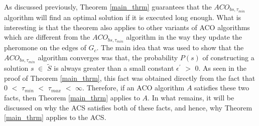 \documentclass[12pt]{article}
\numberwithin{equation}{subsection}
\numberwithin{table}{subsection}
\numberwithin{algorithm}{subsection}
\numberwithin{figure}{subsection}
\begin{document}
As discussed previously, Theorem \ref{main_thrm} guarantees that the $ACO_{bs, \tau_{min}}$ algorithm will find an optimal solution if it is executed long enough. What is interesting is that the theorem also applies to other variants of ACO algorithms which are different from the $ACO_{bs, \tau_{min}}$ algorithm in the way they update the pheromone on the edges of $G_c$. The main idea that was used to show that the $ACO_{bs, \tau_{min}}$ algorithm converges was that, the probability $P(s)$ of constructing a solution $s$ $\in$ $\widetilde{S}$ is always greater than a small constant $\epsilon^\prime$ $>$ 0. As seen in the proof of Theorem \ref{main_thrm}, this fact was obtained directly from the fact that 0 $<$ $\tau_{min}$ $<$ $\tau_{max}$ $<$ $\infty$. Therefore, if an ACO algorithm $A$ satisfies these two facts, then Theorem \ref{main_thrm} applies to $A$. In what remains, it will be discussed on why the ACS satisfies both of these facts, and hence, why Theorem \ref{main_thrm} applies to the ACS. \cite{dorigo_stutzle_thomas_2004}\\\\
\end{document}
